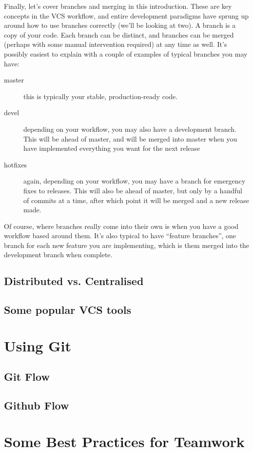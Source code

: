 \documentclass[12pt,a4paper]{article}
\begin{document}
Finally, let's cover branches and merging in this introduction. These
are key concepts in the VCS workflow, and entire development paradigms
have sprung up around how to use branches correctly (we'll be looking
at two). A branch is a copy of your code. Each branch can be distinct,
and branches can be merged (perhaps with some manual intervention
required) at any time as well. It's possibly easiest to explain with
a couple of examples of typical branches you may have:

\begin{description}
  \item[master] this is typically your stable, production-ready
    code.
  \item[devel] depending on your workflow, you may also have a
    development branch. This will be ahead of master, and will be
    merged into master when you have implemented everything you want
    for the next release
  \item[hotfixes] again, depending on your workflow, you may have a
    branch for emergency fixes to releases. This will also be ahead of
    master, but only by a handful of commits at a time, after which
    point it will be merged and a new release made.
\end{description}

Of course, where branches really come into their own is when you have
a good workflow based around them. It's also typical to have ``feature
branches'', one branch for each new feature you are implementing,
which is them merged into the development branch when complete.

\subsection{Distributed vs. Centralised}

\subsection{Some popular VCS tools}

\section{Using Git}

\subsection{Git Flow}

\subsection{Github Flow}

\section{Some Best Practices for Teamwork}
\end{document}
